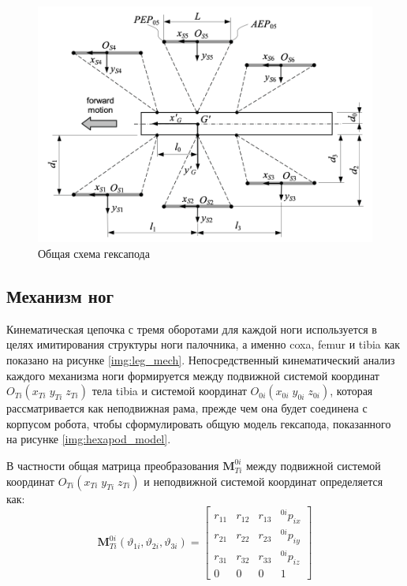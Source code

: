 \begin{figure}[h!]
	\centering
	\includegraphics[]{img/leg_cord}
	\caption{Общая схема гексапода}
	\label{img:leg_cord}
\end{figure}

\subsection{Механизм ног}

Кинематическая цепочка с тремя оборотами для каждой ноги используется в целях имитирования структуры ноги палочника, а именно coxa, femur и tibia как показано на рисунке \ref{img:leg_mech}. Непосредственный кинематический анализ каждого механизма ноги формируется между подвижной системой координат $O_{Ti}(x_{Ti}\;y_{Ti}\;z_{Ti})$ тела tibia и системой координат $O_{0i}(x_{0i}\;y_{0i}\;z_{0i})$, которая рассматривается как неподвижная рама, прежде чем она будет соединена с корпусом робота, чтобы сформулировать общую модель гексапода, показанного на рисунке \ref{img:hexapod_model}.

В частности общая матрица преобразования $\mathbf{M}^{0i}_{Ti}$ между подвижной системой координат $O_{Ti}(x_{Ti}\;y_{Ti}\;z_{Ti})$ и неподвижной системой координат определяется как:
\begin{equation}
	\mathbf{M}^{0i}_{Ti}(\vartheta_{1i},\vartheta_{2i},\vartheta_{3i}) =
	\begin{bmatrix}
		r_{11} & r_{12} & r_{13} & ^{0i}p_{ix}\\
		r_{21} & r_{22} & r_{23} & ^{0i}p_{iy}\\
		r_{31} & r_{32} & r_{33} & ^{0i}p_{iz}\\
		0	&	0	&	0	&	1
	\end{bmatrix}  
\end{equation}

